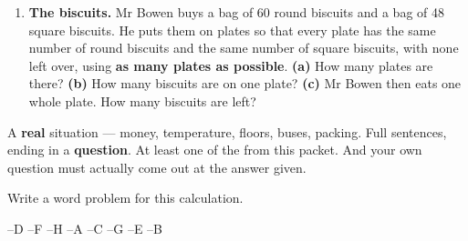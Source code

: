 \documentclass[12pt,a4paper]{article}
\newif\ifkey
\begin{document}
\begin{enumerate}[label=\textbf{\arabic*.}, itemsep=11pt]
  \item \textbf{The biscuits.} Mr Bowen buys a bag of 60 round biscuits and a bag of
        48 square biscuits. He puts them on plates so that every plate has the same
        number of round biscuits and the same number of square biscuits, with none
        left over, using \textbf{as many plates as possible}.
        \textbf{(a)} How many plates are there?
        \textbf{(b)} How many biscuits are on one plate?
        \textbf{(c)} Mr Bowen then eats one whole plate. How many biscuits are left?
        \begin{workspace}[2.6cm]\end{workspace}

\end{enumerate}


\begin{yourturn}
  A \textbf{real} situation --- money, temperature, floors, buses, packing. Full
  sentences, ending in a \textbf{question}. At least one of the 
  from this packet. And your own question must actually come out at the answer given.
\end{yourturn}

\noindent Write a word problem for this calculation.

\vspace{7pt}
\noindent\hspace*{1.2em}

\ifkey
\newpage
{}

\linespread{1.0}\selectfont
{}

--D --F --H --A --C --G --E --B

\smallskip
{}
\end{document}
